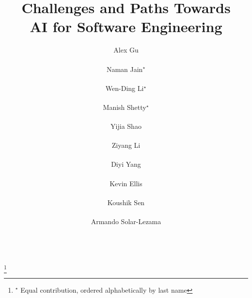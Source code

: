 \documentclass{article}
\title{Challenges and Paths Towards \\ AI for Software Engineering
}
\author{\name Alex Gu
\email{gua@mit.edu} \\
\addr{MIT CSAIL} \\[0.07in]
\name Naman Jain$^{\star}$
\email{naman\_jain@berkeley.edu} \\
\addr{University of California, Berkeley} \\[0.07in]
\name Wen-Ding Li$^{\star}$
\email{wl678@cornell.edu} \\
\addr{Cornell University} \\[0.07in]
\name Manish Shetty$^{\star}$
\email{manishs@berkeley.edu} \\
\addr{University of California, Berkeley} \\[0.07in]
\name Yijia Shao
\email{shaoyj@cs.stanford.edu} \\
\addr{Stanford University} \\[0.07in]
\name Ziyang Li
\email{liby99@seas.upenn.edu} \\
\addr{University of Pennsylvania} \\[0.07in]
\name Diyi Yang
\email{diyiy@cs.stanford.edu} \\
\addr{Stanford University} \\[0.07in]
\name Kevin Ellis
\email{kellis@cornell.edu} \\
\addr{Cornell University} \\[0.07in]
\name Koushik Sen
\email{ksen@berkeley.edu} \\
\addr{University of California, Berkeley} \\[0.07in]
\name Armando Solar-Lezama
\email{asolar@csail.mit.edu} \\
\addr{MIT CSAIL} \\
}
\newcommand\nnfootnote[1]{%
  \begin{NoHyper}
  \renewcommand\thefootnote{}\footnote{#1}%
  \addtocounter{footnote}{-1}%
  \end{NoHyper}
}
\begin{document}
\maketitle
\raggedbottom

\nnfootnote{$^{\star}$ Equal contribution, ordered alphabetically by last name}


\begin{abstract}

\end{abstract}

\clearpage

\tableofcontents

\clearpage



% 

% 

% 
% 



\newpage



\appendix
\newpage

% 
\end{document}

